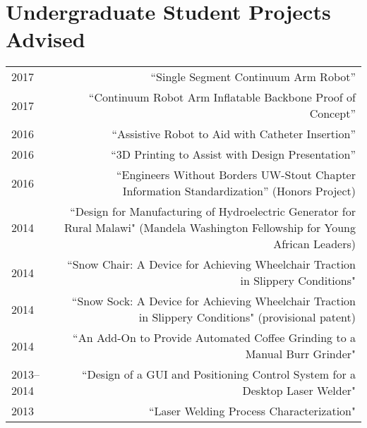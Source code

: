
\section*{Undergraduate Student Projects Advised}
\begin{tabular}{L!{\VRule}R}
2017&``Single Segment Continuum Arm Robot''\\
2017&``Continuum Robot Arm Inflatable Backbone Proof of Concept''\\
2016&``Assistive Robot to Aid with Catheter Insertion''\\
2016&``3D Printing to Assist with Design Presentation''\\
2016&``Engineers Without Borders UW-Stout Chapter Information Standardization'' (Honors Project)\\
2014&``Design for Manufacturing of Hydroelectric Generator for Rural Malawi" (Mandela Washington Fellowship for Young African Leaders)\\
2014&``Snow Chair: A Device for Achieving Wheelchair Traction in Slippery Conditions"\\
2014&``Snow Sock: A Device for Achieving Wheelchair Traction in Slippery Conditions" (provisional patent)\\
2014&``An Add-On to Provide Automated Coffee Grinding to a Manual Burr Grinder"\\
2013--2014&``Design of a GUI and Positioning Control System for a Desktop Laser Welder"\\
2013&``Laser Welding Process Characterization"\\
\end{tabular}
